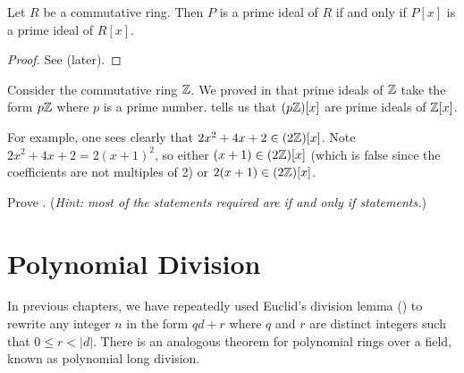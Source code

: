\begin{theorem}\label{thrm-prime-ideal-iff-prime-ideal-in-polynomial-ring}
    Let $R$ be a commutative ring. Then $P$ is a prime ideal of $R$ if and only if $P[x]$ is a prime ideal of $R[x]$.
\end{theorem}
\begin{proof}
    See  (later).
\end{proof}
\begin{example}
    Consider the commutative ring $\mathbb{Z}$. We proved in  that prime ideals of $\mathbb{Z}$ take the form $p\mathbb{Z}$ where $p$ is a prime number.  tells us that $(p\mathbb{Z})[x]$ are prime ideals of $\mathbb{Z}[x]$.

    For example, one sees clearly that $2x^2 + 4x + 2 \in (2\mathbb{Z})[x]$. Note $2x^2 + 4x + 2 = 2(x+1)^2$, so either $(x+1) \in (2\mathbb{Z})[x]$ (which is false since the coefficients are not multiples of 2) or $2(x+1) \in (2\mathbb{Z})[x]$.
\end{example}

\begin{exercise}\label{exercise-prime-ideal-iff-prime-ideal-in-polynomial-ring}
    Prove .\newline
    (\textit{Hint: most of the statements required are if and only if statements.})
\end{exercise}

\section{Polynomial Division}
In previous chapters, we have repeatedly used Euclid's division lemma () to rewrite any integer $n$ in the form $qd + r$ where $q$ and $r$ are distinct integers such that $0 \leq r < |d|$. There is an analogous theorem for polynomial rings over a field, known as polynomial long division.

